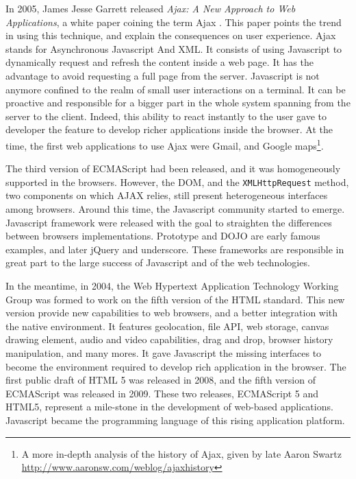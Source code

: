 In 2005, James Jesse Garrett released \textit{Ajax: A New Approach to Web Applications}, a white paper coining the term Ajax \cite{Garrett2005}.
This paper points the trend in using this technique, and explain the consequences on user experience.
Ajax stands for Asynchronous Javascript And XML.
It consists of using Javascript to dynamically request and refresh the content inside a web page.
It has the advantage to avoid requesting a full page from the server.
Javascript is not anymore confined to the realm of small user interactions on a terminal.
It can be proactive and responsible for a bigger part in the whole system spanning from the server to the client.
Indeed, this ability to react instantly to the user gave to developer the feature to develop richer applications inside the browser.
At the time, the first web applications to use Ajax were Gmail, and Google maps\footnote{A more in-depth analysis of the history of Ajax, given by late Aaron Swartz \url{http://www.aaronsw.com/weblog/ajaxhistory}}.

The third version of ECMAScript had been released, and it was homogeneously supported in the browsers.
However, the DOM, and the \texttt{XMLHttpRequest} method, two components on which AJAX relies, still present heterogeneous interfaces among browsers.
Around this time, the Javascript community started to emerge.
Javascript framework were released with the goal to straighten the differences between browsers implementations.
Prototype and DOJO are early famous examples, and later jQuery and underscore.
These frameworks are responsible in great part to the large success of Javascript and of the web technologies.

In the meantime, in 2004, the Web Hypertext Application Technology Working Group was formed to work on the fifth version of the HTML standard.
This new version provide new capabilities to web browsers, and a better integration with the native environment.
It features geolocation, file API, web storage, canvas drawing element, audio and video capabilities, drag and drop, browser history manipulation, and many mores.
It gave Javascript the missing interfaces to become the environment required to develop rich application in the browser.
The first public draft of HTML 5 was released in 2008, and the fifth version of ECMAScript was released in 2009.
These two releases, ECMAScript 5 and HTML5, represent a mile-stone in the development of web-based applications.
Javascript became the programming language of this rising application platform.

